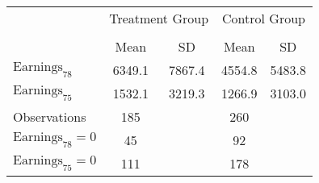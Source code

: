 {
\def\sym#1{\ifmmode^{#1}\else\(^{#1}\)\fi}
\begin{tabular}{l*{2}{cc}}
\hline\hline
                    &\multicolumn{2}{c}{Treatment Group}&\multicolumn{2}{c}{Control Group}\\\cmidrule(lr){2-3}\cmidrule(lr){4-5}
                    &\multicolumn{2}{c}{}     &\multicolumn{2}{c}{}     \\
                    &        Mean&          SD&        Mean&          SD\\
\hline
$\text{Earnings}_{78}$&      6349.1&      7867.4&      4554.8&      5483.8\\
$\text{Earnings}_{75}$&      1532.1&      3219.3&      1266.9&      3103.0\\
\hline
Observations        &         185&            &         260&            \\
$\text{Earnings}_{78}=0$&          45&            &          92&            \\
$\text{Earnings}_{75}=0$&         111&            &         178&            \\
\hline\hline
\end{tabular}
}

